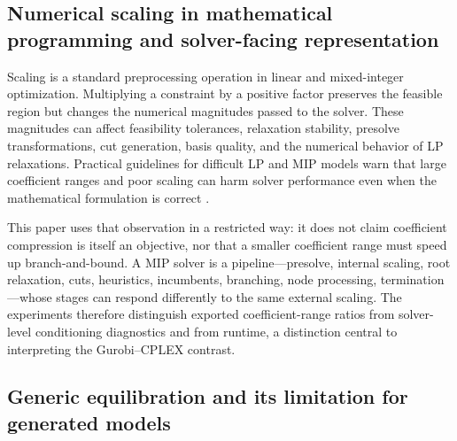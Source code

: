 \documentclass[AMA,Times1COL]{WileyNJDv5} %
\providecommand{\DIFadd}[1]{{\protect\color{blue} \sf #1}} %
\providecommand{\DIFdel}[1]{{\protect\color{red} \scriptsize #1}} %
\providecommand{\DIFaddbegin}{} %
\providecommand{\DIFaddend}{} %
\providecommand{\DIFdelbegin}{} %
\providecommand{\DIFdelend}{} %
\begin{document}
\subsection{Numerical scaling \DIFdelbegin \DIFdel{in mathematical programming}\DIFdelend \DIFaddbegin \DIFadd{and solver-facing representation}\DIFaddend }

Scaling is a standard preprocessing operation in linear and mixed-integer optimization.
Multiplying a constraint by a positive factor preserves the feasible region but changes
the numerical magnitudes passed to the solver. These magnitudes can affect feasibility
tolerances, relaxation stability, presolve transformations, \DIFaddbegin \DIFadd{cut generation, basis quality,
}\DIFaddend and the numerical behavior of LP relaxations. Practical guidelines for difficult LP and
MIP models warn that large coefficient ranges and poor scaling can harm solver
performance even when the mathematical formulation is correct \DIFdelbegin \DIFdel{\citep{klotz2013lp,klotz2013mip}}\DIFdelend \DIFaddbegin \DIFadd{\cite{klotz2013lp,klotz2013mip}}\DIFaddend .

\DIFaddbegin \DIFadd{This paper uses that observation in a restricted way: it does not claim coefficient compression
is itself an objective, nor that a smaller coefficient range must speed up branch-and-bound. A MIP
solver is a pipeline---presolve, internal scaling, root relaxation, cuts, heuristics, incumbents,
branching, node processing, termination---whose stages can respond differently to the same
external scaling. The experiments therefore distinguish exported coefficient-range ratios from
solver-level conditioning diagnostics and from runtime, a distinction central to interpreting the
Gurobi--CPLEX contrast.
}

\subsection{\DIFadd{Generic equilibration and its limitation for generated models}}
\end{document}
